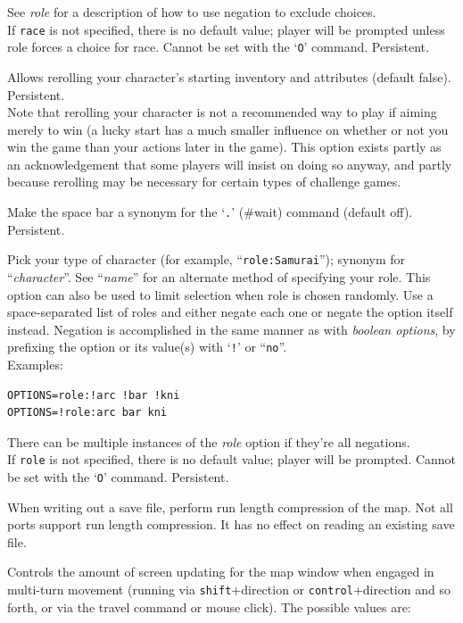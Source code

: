 \documentclass[titlepage]{article}
\begin{document}
\begin{description}[font=\mdseries\itshape]
See \textit{role}
for a description of how to use negation to exclude choices.
\\
If \texttt{race} is not specified, there is no default value;
player will be prompted unless role forces a choice for race.
Cannot be set with the `\texttt{O}' command.  Persistent.
\item[reroll]
Allows rerolling your character's starting inventory and attributes (default
false).  Persistent.
\\
Note that rerolling your character is not a recommended way to play if aiming
merely to win (a lucky start has a much smaller influence on whether or not
you win the game than your actions later in the game).  This option exists
partly as an acknowledgement that some players will insist on doing so anyway,
and partly because rerolling may be necessary for certain types of challenge
games.
\item[rest\textunderscore on\textunderscore space]
Make the space bar a synonym for the `\texttt{.}' (\#wait) command (default off).
Persistent.
\item[role]
Pick your type of character (for example, ``\texttt{role:Samurai}'');
synonym for ``\textit{character}''.
See ``\textit{name}'' for an alternate method of specifying your role.
This option can also be used to limit selection when role is chosen
randomly.
Use a space-separated list of roles and either negate each one or negate
the option itself instead.
Negation is accomplished in the same manner as with \textit{boolean options},
by prefixing the option or its value(s) with `\texttt{!}' or ``\texttt{no}''.
\\
Examples:
\\
\begin{verbatim}
OPTIONS=role:!arc !bar !kni
OPTIONS=!role:arc bar kni
\end{verbatim}
There can be multiple instances of the \textit{role}
option if they're all negations.
\\
If \texttt{role} is not specified, there is no default value;
player will be prompted.
Cannot be set with the `\texttt{O}' command.  Persistent.
\item[rlecomp]
When writing out a save file, perform run length compression of the map.
Not all ports support run length compression. It has no
effect on reading an existing save file.
\item[runmode]
Controls the amount of screen updating for the map window when engaged
in multi-turn movement (running via \texttt{shift}+direction
or \texttt{control}+direction
and so forth, or via the travel command or mouse click).
The possible values are:


\end{description}
\end{document}
